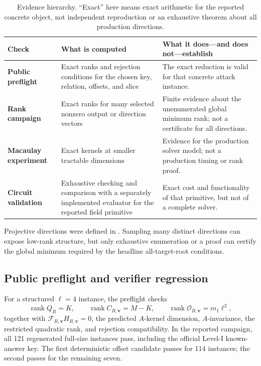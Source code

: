 \documentclass[11pt]{article}
\newcommand{\rank}{\operatorname{rank}}
\begin{document}
\begin{table}[H]
\centering
\caption{Evidence hierarchy.  ``Exact'' here means exact arithmetic for the
reported concrete object, not independent reproduction or an exhaustive
theorem about all production directions.}
\label{tab:evidence-hierarchy}
\small
\renewcommand{\arraystretch}{1.12}
\begin{tabularx}{0.96\textwidth}{@{}>{\raggedright\arraybackslash\bfseries}p{}>{\raggedright\arraybackslash}p{}>{\raggedright\arraybackslash}X@{}}
\toprule
Check & What is computed & What it does---and does not---establish\\
\midrule
Public preflight & Exact ranks and rejection conditions for the chosen key,
relation, offsets, and slice & The exact reduction is valid for that concrete
attack instance.\\
Rank campaign & Exact ranks for many selected nonzero output or direction
vectors & Finite evidence about the unenumerated global minimum rank; not a
certificate for all directions.\\
Macaulay experiment & Exact kernels at smaller tractable dimensions & Evidence
for the production solver model; not a production timing or rank proof.\\
Circuit validation & Exhaustive checking and comparison with a separately
implemented evaluator for the reported field primitive & Exact cost and
functionality of that primitive, but not of a
complete solver.\\
\bottomrule
\end{tabularx}
\end{table}

Projective directions were defined in .  Sampling
many distinct directions can expose low-rank structure, but only exhaustive
enumeration or a proof can certify the global minimum required by the
headline all-target-root conditions.

\subsection{Public preflight and verifier regression}

For a structured $\ell=4$ instance, the preflight checks
\[
 \rank Q_R=K,\qquad \rank C_{R,\mathbf v}=M-K,\qquad
 \rank\mathcal O_{R,\mathbf v}=m_1\ell^2,
\]
together with $\mathcal F_{R,\mathbf v}H_{R,\mathbf v}=0$, the predicted $A$-kernel
dimension, $A$-invariance, the restricted quadratic rank, and rejection
compatibility.  In the reported campaign, all 121 regenerated full-size
instances pass,
including the official Level-I known-answer key.  The first deterministic
offset candidate passes for 114 instances; the second passes for the remaining
seven.
\end{document}
